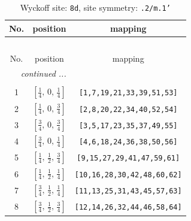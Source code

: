 \documentclass[fleqn,8pt]{jsarticle}
\begin{document}
\begin{longtable}{ccc}
\caption{Wyckoff site: {\tt 8d}, site symmetry: {\tt .2/m.1'}}
 \\
 \hline \hline
No. & position & mapping \\ \hline \endfirsthead

\multicolumn{2}{l}{\tablename\ \thetable{}} \\
 \hline \hline
No. & position & mapping \\ \hline \endhead

 \hline \hline
\multicolumn{2}{r}{\footnotesize\it continued ...} \\ \endfoot

 \hline \hline
\multicolumn{2}{r}{} \\ \endlastfoot

1 & $\left[ \frac{1}{4},\, 0,\, \frac{1}{4} \right]$ & {\tt [1,7,19,21,33,39,51,53]} \\ \hline
2 & $\left[ \frac{1}{4},\, 0,\, \frac{3}{4} \right]$ & {\tt [2,8,20,22,34,40,52,54]} \\ \hline
3 & $\left[ \frac{3}{4},\, 0,\, \frac{3}{4} \right]$ & {\tt [3,5,17,23,35,37,49,55]} \\ \hline
4 & $\left[ \frac{3}{4},\, 0,\, \frac{1}{4} \right]$ & {\tt [4,6,18,24,36,38,50,56]} \\ \hline
5 & $\left[ \frac{1}{4},\, \frac{1}{2},\, \frac{3}{4} \right]$ & {\tt [9,15,27,29,41,47,59,61]} \\ \hline
6 & $\left[ \frac{1}{4},\, \frac{1}{2},\, \frac{1}{4} \right]$ & {\tt [10,16,28,30,42,48,60,62]} \\ \hline
7 & $\left[ \frac{3}{4},\, \frac{1}{2},\, \frac{1}{4} \right]$ & {\tt [11,13,25,31,43,45,57,63]} \\ \hline
8 & $\left[ \frac{3}{4},\, \frac{1}{2},\, \frac{3}{4} \right]$ & {\tt [12,14,26,32,44,46,58,64]} \\
\end{longtable}
\renewcommand{\arraystretch}{1.2}
\end{document}
